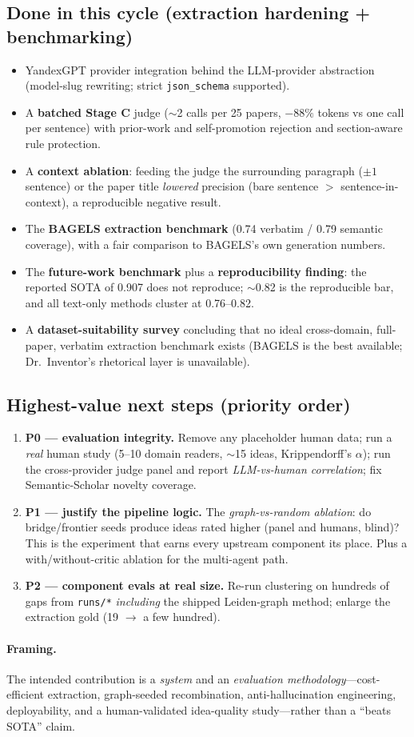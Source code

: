 \subsection{Done in this cycle (extraction hardening + benchmarking)}
\begin{itemize}
  \item YandexGPT provider integration behind the LLM-provider abstraction
        (model-slug rewriting; strict \texttt{json\_schema} supported).
  \item A \textbf{batched Stage C} judge ($\sim$2 calls per 25 papers,
        $-88\%$ tokens vs one call per sentence) with prior-work and
        self-promotion rejection and section-aware rule protection.
  \item A \textbf{context ablation}: feeding the judge the surrounding paragraph
        ($\pm 1$ sentence) or the paper title \emph{lowered} precision (bare
        sentence $>$ sentence-in-context), a reproducible negative result.
  \item The \textbf{BAGELS extraction benchmark} (0.74 verbatim / 0.79 semantic
        coverage), with a fair comparison to BAGELS's own generation numbers.
  \item The \textbf{future-work benchmark} plus a \textbf{reproducibility
        finding}: the reported SOTA of 0.907 does not reproduce; $\sim$0.82 is the
        reproducible bar, and all text-only methods cluster at 0.76--0.82.
  \item A \textbf{dataset-suitability survey} concluding that no ideal
        cross-domain, full-paper, verbatim extraction benchmark exists (BAGELS is
        the best available; Dr.\ Inventor's rhetorical layer is unavailable).
\end{itemize}

\subsection{Highest-value next steps (priority order)}
\begin{enumerate}
  \item \textbf{P0 --- evaluation integrity.} Remove any placeholder human data;
        run a \emph{real} human study (5--10 domain readers, $\sim$15 ideas,
        Krippendorff's $\alpha$); run the cross-provider judge panel and report
        \emph{LLM-vs-human correlation}; fix Semantic-Scholar novelty coverage.
  \item \textbf{P1 --- justify the pipeline logic.} The \emph{graph-vs-random
        ablation}: do bridge/frontier seeds produce ideas rated higher (panel and
        humans, blind)? This is the experiment that earns every upstream component
        its place. Plus a with/without-critic ablation for the multi-agent path.
  \item \textbf{P2 --- component evals at real size.} Re-run clustering on hundreds
        of gaps from \texttt{runs/*} \emph{including} the shipped Leiden-graph
        method; enlarge the extraction gold (19 $\rightarrow$ a few hundred).
\end{enumerate}

\paragraph{Framing.} The intended contribution is a \emph{system} and an
\emph{evaluation methodology}---cost-efficient extraction, graph-seeded
recombination, anti-hallucination engineering, deployability, and a
human-validated idea-quality study---rather than a ``beats SOTA'' claim.
